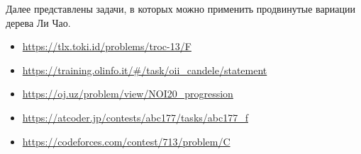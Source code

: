 Далее представлены задачи, в которых можно применить продвинутые вариации дерева Ли Чао.

\begin{itemize}
 
    \item \href{https://tlx.toki.id/problems/troc-13/F}{https://tlx.toki.id/problems/troc-13/F}

    \item \href{https://training.olinfo.it/\#/task/oii_candele/statement}{https://training.olinfo.it/\#/task/oii\_candele/statement}

    \item \href{https://oj.uz/problem/view/NOI20_progression}{https://oj.uz/problem/view/NOI20\_progression}

    \item \href{https://atcoder.jp/contests/abc177/tasks/abc177_f}{https://atcoder.jp/contests/abc177/tasks/abc177\_f}

    \item \href{https://codeforces.com/contest/713/problem/C}{https://codeforces.com/contest/713/problem/C}   
\end{itemize}

